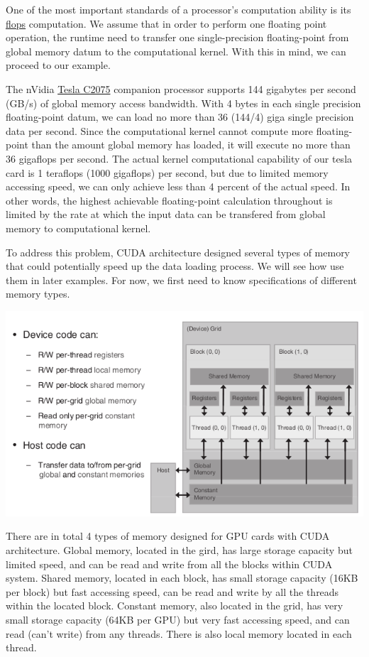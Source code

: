 \documentclass[letterpaper,10pt,english]{sphinxmanual}
\begin{document}
One of the most important standards of a processor's computation ability is its \href{http://en.wikipedia.org/wiki/FLOPS}{flops} computation. We assume that in order to perform one floating point operation, the runtime need to transfer one single-precision floating-point from global memory datum to the computational kernel. With this in mind, we can proceed to our example.

The nVidia \href{http://www.nvidia.com/docs/IO/43395/NV-DS-Tesla-C2075.pdf}{Tesla C2075} companion processor supports 144 gigabytes per second (GB/s) of global memory access bandwidth. With 4 bytes in each single precision floating-point datum, we can load no more than 36 (144/4) giga single precision data per second. Since the computational kernel cannot compute more floating-point than the amount global memory has loaded, it will execute no more than 36 gigaflops per second. The actual kernel computational capability of our tesla card is 1 teraflops (1000 gigaflops) per second, but due to limited memory accessing speed, we can only achieve less than 4 percent of the actual speed. In other words, the highest achievable floating-point calculation throughout is limited by the rate at which the input data can be transfered from global memory to computational kernel.

To address this problem, CUDA architecture designed several types of memory that could potentially speed up the data loading process. We will see how use them in later examples. For now, we first need to know specifications of different memory types.

{\hfill\includegraphics{MT.png}\hfill}

There are in total 4 types of memory designed for GPU cards with CUDA architecture. Global memory, located in the gird, has large storage capacity but limited speed, and can be read and write from all the blocks within CUDA system. Shared memory, located in each block, has small storage capacity (16KB per block) but fast accessing speed, can be read and write by all the threads within the located block. Constant memory, also located in the grid, has very small storage capacity (64KB per GPU) but very fast accessing speed, and can read (can't write) from any threads. There is also local memory located in each thread.
\end{document}
